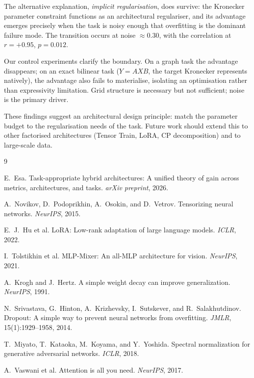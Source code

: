 \documentclass[11pt,a4paper]{article}
\begin{document}
The alternative explanation, \emph{implicit regularisation},
does survive: the Kronecker parameter constraint functions as an
architectural regulariser, and its advantage emerges precisely
when the task is noisy enough that overfitting is the dominant
failure mode. The transition occurs at noise $\approx 0.30$,
with the correlation at $r = +0.95$, $p = 0.012$.

Our control experiments clarify the boundary. On a graph task
the advantage disappears; on an exact bilinear task
($Y = AXB$, the target Kronecker represents natively), the
advantage also fails to materialise, isolating an optimisation
rather than expressivity limitation. Grid structure is
necessary but not sufficient; noise is the primary driver.

These findings suggest an architectural design principle: match
the parameter budget to the regularisation needs of the task.
Future work should extend this to other factorised architectures
(Tensor Train, LoRA, CP decomposition) and to large-scale data.



\begin{thebibliography}{9}

E.~Esa. Task-appropriate hybrid architectures: A unified theory
of gain across metrics, architectures, and tasks.
\emph{arXiv preprint}, 2026.

A.~Novikov, D.~Podoprikhin, A.~Osokin, and D.~Vetrov.
Tensorizing neural networks. \emph{NeurIPS}, 2015.

E.~J.~Hu et al. LoRA: Low-rank adaptation of large language
models. \emph{ICLR}, 2022.

I.~Tolstikhin et al. MLP-Mixer: An all-MLP architecture for
vision. \emph{NeurIPS}, 2021.

A.~Krogh and J.~Hertz. A simple weight decay can improve
generalization. \emph{NeurIPS}, 1991.

N.~Srivastava, G.~Hinton, A.~Krizhevsky, I.~Sutskever, and
R.~Salakhutdinov. Dropout: A simple way to prevent neural
networks from overfitting. \emph{JMLR}, 15(1):1929--1958, 2014.

T.~Miyato, T.~Kataoka, M.~Koyama, and Y.~Yoshida. Spectral
normalization for generative adversarial networks.
\emph{ICLR}, 2018.

A.~Vaswani et al. Attention is all you need. \emph{NeurIPS}, 2017.

\end{thebibliography}
\end{document}
